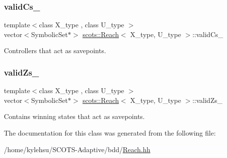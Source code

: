 \subsubsection{\texorpdfstring{valid\+Cs\+\_\+}{validCs\_}}
{\footnotesize\ttfamily template$<$class X\+\_\+type , class U\+\_\+type $>$ \\
vector$<$Symbolic\+Set$\ast$$>$ \hyperlink{classscots_1_1Reach}{scots\+::\+Reach}$<$ X\+\_\+type, U\+\_\+type $>$\+::valid\+Cs\+\_\+}

Controllers that act as savepoints. \mbox{\label{classscots_1_1Reach_a2f484ac1e7bd5a451b409c373149369c}} 
\subsubsection{\texorpdfstring{valid\+Zs\+\_\+}{validZs\_}}
{\footnotesize\ttfamily template$<$class X\+\_\+type , class U\+\_\+type $>$ \\
vector$<$Symbolic\+Set$\ast$$>$ \hyperlink{classscots_1_1Reach}{scots\+::\+Reach}$<$ X\+\_\+type, U\+\_\+type $>$\+::valid\+Zs\+\_\+}

Contains winning states that act as savepoints. 

The documentation for this class was generated from the following file\+:\begin{DoxyCompactItemize}
\item 
/home/kylehsu/\+S\+C\+O\+T\+S-\/\+Adaptive/bdd/\hyperlink{Reach_8hh}{Reach.\+hh}\end{DoxyCompactItemize}
